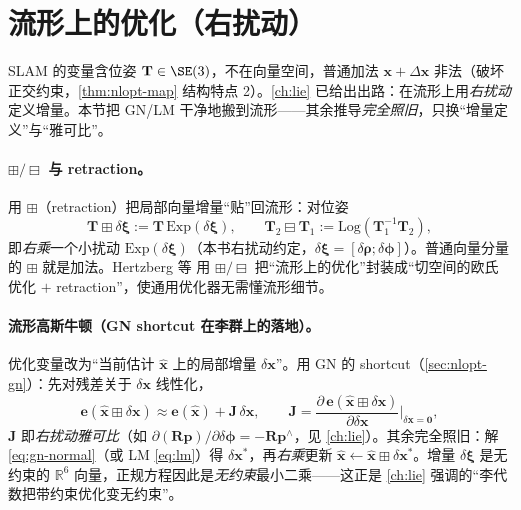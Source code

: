 \section{流形上的优化（右扰动）}
\label{sec:nlopt-manifold}

SLAM 的变量含位姿 $\mathbf{T}\in\SE(3)$，不在向量空间，普通加法 $\mathbf{x}+\Delta\mathbf{x}$ 非法（破坏正交约束，\cref{thm:nlopt-map} 结构特点 2）。\cref{ch:lie} 已给出出路：在流形上用\emph{右扰动}定义增量。本节把 GN/LM 干净地搬到流形——其余推导\emph{完全照旧}，只换“增量定义”与“雅可比”。

\paragraph{$\boxplus/\boxminus$ 与 retraction。}\cite{hertzberg2013integrating}
用 \emph{$\boxplus$}（retraction）把局部向量增量“贴”回流形：对位姿
\begin{equation}
  \mathbf{T}\boxplus\delta\boldsymbol{\xi}:=\mathbf{T}\,\mathrm{Exp}(\delta\boldsymbol{\xi}),\qquad
  \mathbf{T}_2\boxminus\mathbf{T}_1:=\mathrm{Log}(\mathbf{T}_1^{-1}\mathbf{T}_2),
  \label{eq:retraction}
\end{equation}
即\emph{右乘}一个小扰动 $\mathrm{Exp}(\delta\boldsymbol{\xi})$（本书右扰动约定，$\delta\boldsymbol{\xi}=[\delta\boldsymbol{\rho};\delta\boldsymbol{\phi}]$）。普通向量分量的 $\boxplus$ 就是加法。Hertzberg 等\cite{hertzberg2013integrating} 用 $\boxplus/\boxminus$ 把“流形上的优化”封装成“切空间的欧氏优化 $+$ retraction”，使通用优化器无需懂流形细节。

\paragraph{流形高斯牛顿（GN shortcut 在李群上的落地）。}\cite{barfoot2024state,gaoxiang2019slam14}
优化变量改为“当前估计 $\hat{\mathbf{x}}$ 上的局部增量 $\delta\mathbf{x}$”。用 GN 的 shortcut（\cref{sec:nlopt-gn}）：先对残差关于 $\delta\mathbf{x}$ 线性化，
\begin{equation}
  \mathbf{e}(\hat{\mathbf{x}}\boxplus\delta\mathbf{x})\approx\mathbf{e}(\hat{\mathbf{x}})+\mathbf{J}\,\delta\mathbf{x},\qquad
  \mathbf{J}=\frac{\partial\,\mathbf{e}(\hat{\mathbf{x}}\boxplus\delta\mathbf{x})}{\partial\delta\mathbf{x}}\bigg|_{\delta\mathbf{x}=\mathbf{0}},
  \label{eq:manifold-jac}
\end{equation}
$\mathbf{J}$ 即\emph{右扰动雅可比}（如 $\partial(\mathbf{R}\mathbf{p})/\partial\delta\boldsymbol{\phi}=-\mathbf{R}\mathbf{p}^\wedge$，见 \cref{ch:lie}）。其余完全照旧：解 \cref{eq:gn-normal}（或 LM \cref{eq:lm}）得 $\delta\mathbf{x}^*$，再\emph{右乘}更新 $\hat{\mathbf{x}}\leftarrow\hat{\mathbf{x}}\boxplus\delta\mathbf{x}^*$。增量 $\delta\boldsymbol{\xi}$ 是无约束的 $\mathbb{R}^6$ 向量，正规方程因此是\emph{无约束}最小二乘——这正是 \cref{ch:lie} 强调的“李代数把带约束优化变无约束”。

